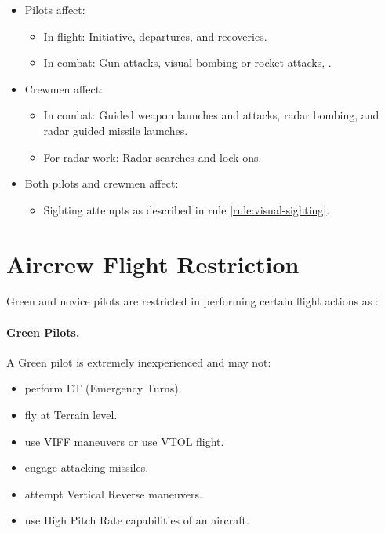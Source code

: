 \begin{advancedrules}
\begin{itemize}
\item Pilots affect:
\begin{itemize}
    \item In flight: Initiative, departures, and recoveries.
    \item In combat: Gun attacks, visual bombing or rocket attacks, .
\end{itemize}

\item Crewmen affect:
\begin{itemize}
    \item In combat: Guided weapon launches and attacks, radar bombing, and radar guided missile launches.
    \item For radar work:  Radar searches and lock-ons.
\end{itemize}

\item Both pilots and crewmen affect:
\begin{itemize}
    \item Sighting attempts as described in rule \ref{rule:visual-sighting}.
\end{itemize}
\end{itemize}

\section{Aircrew Flight Restriction}


Green and novice pilots are restricted in performing certain flight actions as :

\paragraph{Green Pilots.} A Green pilot is extremely inexperienced and may not:
\begin{itemize}
    \item perform ET (Emergency Turns).
    \item fly at Terrain level.
    \item use VIFF maneuvers or use VTOL flight.
    \item engage attacking missiles.
    \item attempt Vertical Reverse maneuvers.
    \item use High Pitch Rate capabilities of an aircraft. 
\end{itemize}


\end{advancedrules}
